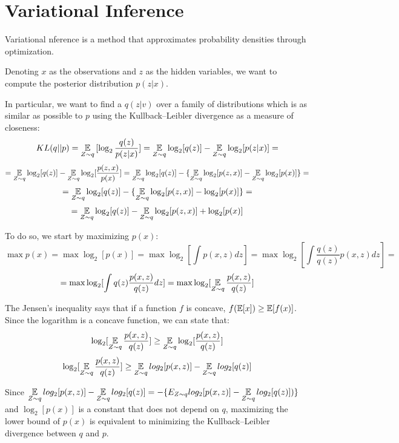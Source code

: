 \chapter{Variational Inference} \label{vi}
Variational nference is a method that approximates probability densities through optimization.

Denoting $x$ as the observations and $z$ as the hidden variables,
we want to compute the posterior distribution $p(z | x)$.

In particular, we want to find a $q(z | v)$ over a family of distributions which is as similar
as possible to $p$ using the Kullback–Leibler divergence as a measure of closeness:
$$ KL(q || p) = \operatorname*{\mathbb{E}}_{Z \sim q} {[\log_2 \frac{q(z)}{p(z | x)}]} = \operatorname*{\mathbb{E}}_{Z \sim q} \log_2 [q(z)] - \operatorname*{\mathbb{E}}_{Z \sim q} \log_2 [p(z | x)] = $$
$$ = \operatorname*{\mathbb{E}}_{Z \sim q} \log_2 [q(z)] - \operatorname*{\mathbb{E}}_{Z \sim q} \log_2 [\frac{p(z,x)}{p(x)}] = \operatorname*{\mathbb{E}}_{Z \sim q} \log_2 [q(z)] - \{ \operatorname*{\mathbb{E}}_{Z \sim q} \log_2 [p(z,x)] - \operatorname*{\mathbb{E}}_{Z \sim q} \log_2 [p(x)] \} = $$
$$ = \operatorname*{\mathbb{E}}_{Z \sim q} \log_2 [q(z)] - \{ \operatorname*{\mathbb{E}}_{Z \sim q} \log_2 [p(z,x)] - \log_2 [p(x)] \} = $$
$$ = \operatorname*{\mathbb{E}}_{Z \sim q} \log_2 [q(z)] - \operatorname*{\mathbb{E}}_{Z \sim q} \log_2 [p(z,x)] + \log_2 [p(x)] $$


To do so, we start by maximizing $p(x)$:
$$
    \displaystyle \max p(x) = \max \log_2[p(x)]
    = \max \log_2[\int p(x,z) dz]
    = \max \log_2[\int \frac{q(z)}{q(z)} p(x,z) dz] =
$$
$$
    = \max \log_2[\int q(z) \frac{p(x,z)}{q(z)} dz]
    = \max \log_2[\operatorname*{\mathbb{E}}_{Z \sim q} \frac{p(x,z)}{q(z)}]
$$

The Jensen's inequality says that if a function $f$ is concave, $f(\operatorname*{\mathbb{E}}[x]) \geq \operatorname*{\mathbb{E}}[f(x)]$.
Since the logarithm is a concave function, we can state that:
$$ \log_2[\operatorname*{\mathbb{E}}_{Z \sim q} \frac{p(x,z)}{q(z)}] \geq \operatorname*{\mathbb{E}}_{Z \sim q} \log_2[\frac{p(x,z)}{q(z)}] $$
$$ \log_2[\operatorname*{\mathbb{E}}_{Z \sim q} \frac{p(x,z)}{q(z)}] \geq \operatorname*{\mathbb{E}}_{Z \sim q} log_2[p(x,z)] - \operatorname*{\mathbb{E}}_{Z \sim q} log_2[q(z)] $$

Since $ \displaystyle \operatorname*{\mathbb{E}}_{Z \sim q} log_2[p(x,z)] - \operatorname*{\mathbb{E}}_{Z \sim q} log_2[q(z)] = -\{E_{Z \sim q} log_2[p(x,z)] - \operatorname*{\mathbb{E}}_{Z \sim q} log_2[q(z)])\}$
and $\log_2[p(x)]$ is a constant that does not depend on $q$,
maximizing the lower bound of $p(x)$ is equivalent to minimizing the Kullback–Leibler divergence between $q$ and $p$.

